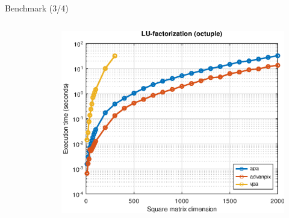\begin{frame}{Benchmark (3/4)}
\begin{columns}
\begin{column}{0.3\textwidth}
\begin{figure}
\end{figure}
\end{column}
\begin{column}{0.3\textwidth}
\begin{figure}
\centering
\includegraphics[width=1.0\linewidth]{res/data/2021-11-24_run-01-lu-octuple-semilogy}
\end{figure}
\end{column}
\end{columns}

\end{frame}


